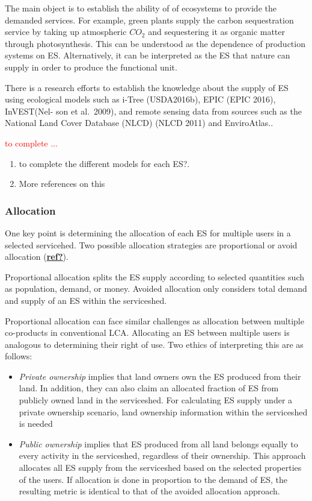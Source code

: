 \documentclass[
  14pt,
]{extarticle}
\providecommand{\tightlist}{%
  \setlength{\itemsep}{0pt}\setlength{\parskip}{0pt}}
\def\tightlist{}
\begin{document}
The main object is to establish the ability of of ecosystems to provide the demanded services.
For example, green plants supply the carbon sequestration service by taking up atmospheric \(CO_{2}\) and sequestering it as organic matter through photosynthesis.
This can be understood as the dependence of production systems on ES.
Alternatively, it can be interpreted as the ES that nature can supply in order to produce the functional unit.

There is a research efforts to establish the knowledge about the supply of ES using ecological models such as
i-Tree (USDA2016b), EPIC (EPIC 2016), InVEST(Nel- son et al.~2009), and remote sensing data from sources such as the National Land Cover Database (NLCD) (NLCD 2011) and EnviroAtlas..

\textcolor{red}{to complete ... }

\begin{enumerate}
\def\labelenumi{\arabic{enumi}.}
\tightlist
\item
  to complete the different models for each ES?.
\item
  More references on this
\end{enumerate}

\hypertarget{allocation}{%
\subsubsection{Allocation}\label{allocation}}

One key point is determining the allocation of each ES for multiple users in a selected servicehed.
Two possible allocation strategies are proportional or avoid allocation (\protect\hyperlink{ref-ref}{\textbf{ref?}}).

Proportional allocation splits the ES supply according to selected quantities such as population, demand, or money.
Avoided allocation only considers total demand and supply of an ES within the serviceshed.

Proportional allocation can face similar challenges as allocation between multiple co-products in conventional LCA.
Allocating an ES between multiple users is analogous to determining their right of use. Two ethics of interpreting this are as follows:

\begin{itemize}
\item
  \emph{Private ownership} implies that land owners own the ES produced from their land. In addition, they can also claim an allocated fraction of ES from publicly owned land in the serviceshed.
  For calculating ES supply under a private ownership scenario, land ownership information within the serviceshed is needed
\item
  \emph{Public ownership} implies that ES produced from all land belongs equally to every activity in the serviceshed, regardless of their ownership.
  This approach allocates all ES supply from the serviceshed based on the selected properties of the users.
  If allocation is done in proportion to the demand of ES, the resulting metric is identical to that of the avoided allocation approach.
\end{itemize}
\end{document}
